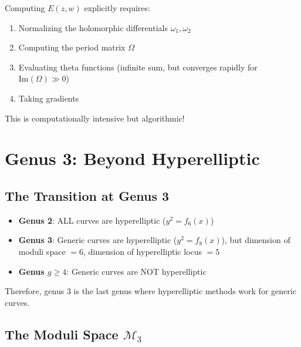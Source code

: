 \begin{remark}
\label{rem:prime-form-computation}
Computing $E(z,w)$ explicitly requires:
\begin{enumerate}
\item Normalizing the holomorphic differentials $\omega_1, \omega_2$
\item Computing the period matrix $\Omega$
\item Evaluating theta functions (infinite sum, but converges rapidly for $\text{Im}(\Omega) \gg 0$)
\item Taking gradients
\end{enumerate}

This is computationally intensive but algorithmic!
\end{remark}

\section{Genus 3: Beyond Hyperelliptic}
\label{sec:genus-3-complete}

\subsection{The Transition at Genus 3}

\begin{principle}
\label{princ:genus3-transition}
\begin{itemize}
\item \textbf{Genus 2}: ALL curves are hyperelliptic ($y^2 = f_6(x)$)
\item \textbf{Genus 3}: Generic curves are hyperelliptic ($y^2 = f_8(x)$), 
      but dimension of moduli space $= 6$, dimension of hyperelliptic locus $= 5$
\item \textbf{Genus $g \geq 4$}: Generic curves are NOT hyperelliptic
\end{itemize}

Therefore, genus 3 is the last genus where hyperelliptic methods work for generic curves.
\end{principle}

\subsection{The Moduli Space $\mathcal{M}_3$}


